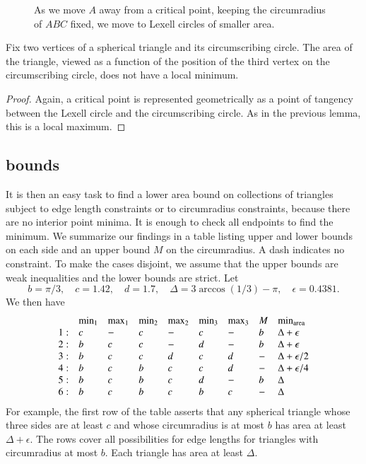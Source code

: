 \begin{figure}[htb]
  \centering
  \caption{As we move $A$ away from a critical
point, keeping the circumradius of $ABC$ fixed, we move to Lexell
circles of smaller area.}
  \label{fig:13:B}
\end{figure}

\begin{lemma} Fix two vertices of a spherical triangle
and its circumscribing circle.  The area of the triangle, viewed
as a function of the position of the third vertex on the
circumscribing circle, does not have a local minimum.
\end{lemma}

\begin{proof}  Again, a critical point is represented
geometrically as a point of tangency between the Lexell circle and
the circumscribing circle.  As in the previous lemma, this is a
local maximum.
\end{proof}


\subsection{bounds}

It is then an easy task to find a lower area bound on collections
of triangles subject to edge length constraints or to circumradius
constraints, because there are no interior point minima.  It is
enough to check all endpoints to find the minimum.  We summarize
our findings in a table listing upper and lower bounds on each
side and an upper bound $M$ on the circumradius.  A dash indicates
no constraint.   To make the cases disjoint, we assume that the upper
bounds are weak inequalities and the lower bounds are strict.   Let
    $$
    b = \pi/3, \quad c = 1.42, \quad d = 1.7,\quad
    \Delta = 3\arccos(1/3)-\pi,\quad \epsilon = 0.4381.
    $$
We then have
$$
    \begin{array}{lllllllll}
 &\min_1&\max_1&\min_2&\max_2&\min_3&\max_3&M    &\min_{{\operatorname{area}}}\\
 1:&c &- &c &- &c &- &b &\Delta+\epsilon\\
 2:&b &c &c &- &d &- &b &\Delta+\epsilon\\
 3:&b &c &c &d &c &d &- &\Delta+\epsilon/2\\
 4:&b &c &b &c &c &d &- &\Delta+\epsilon/4\\
 5:&b &c &b &c &d &- &b &\Delta\\
 6:&b &c &b &c &b &c &- &\Delta
    \end{array}
$$
For example, the first row of the table 
asserts that any spherical triangle whose three sides are at least
$c$ and whose circumradius is at most $b$ has area at least $\Delta+\epsilon$.
 The rows cover all
possibilities for edge lengths for triangles with circumradius at most $b$.
Each triangle has area at least $\Delta$.


